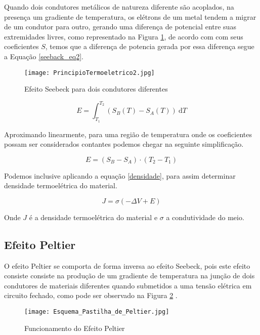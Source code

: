 \documentclass[a4paper,12pt]{article}
\begin{document}
\noindent Quando dois condutores metálicos de natureza diferente são acoplados, na presença um gradiente de temperatura, os elétrons de um metal tendem a migrar de um condutor para outro, gerando uma diferença de potencial entre suas extremidades livres, como representado na Figura \ref{seebeck2}, de acordo com com seus coeficientes $S$, temos que a diferença de potencia gerada por essa diferença segue a Equação \ref{seeback_eq2}.

\begin{figure}[htbp]
    \centering
    \texttt{[image: PrincipioTermoeletrico2.jpg]}
    \caption{Efeito Seebeck para dois condutores diferentes}
    \label{seebeck2}
\end{figure}

\begin{equation}
    E = \int_{T_{1}}^{T_{2}} (S_{B}(T) - S_{A}(T))~\mathrm{d}T
    \label{seeback_eq2}
\end{equation}

\noindent Aproximando linearmente, para uma região de temperatura  onde os coeficientes possam ser considerados contantes podemos chegar na seguinte simplificação.

\begin{equation}
    E = (S_{B} - S_{A}) \cdot  (T_{2} - T_{1})
\end{equation}

\noindent Podemos inclusive aplicando a equação \ref{densidade}, para assim determinar densidade termoelétrica do material.

\begin{equation}
    J = \sigma (-\Delta V + E)
    \label{densidade}
\end{equation}

\noindent Onde $J$ é a densidade termoelétrica do material e $\sigma$ a condutividade do meio.

\subsection{Efeito Peltier}
O efeito Peltier se comporta de forma inversa ao efeito Seebeck, pois este efeito consiste consiste na produção de um gradiente de temperatura na junção de dois condutores de materiais diferentes quando submetidos a uma tensão elétrica em circuito fechado, como pode ser observado na Figura \ref{peltier} . 

\begin{figure}[htbp]
    \centering
    \texttt{[image: Esquema\_Pastilha\_de\_Peltier.jpg]}
    \caption{Funcionamento do Efeito Peltier}
    \label{peltier}
\end{figure}
\end{document}
